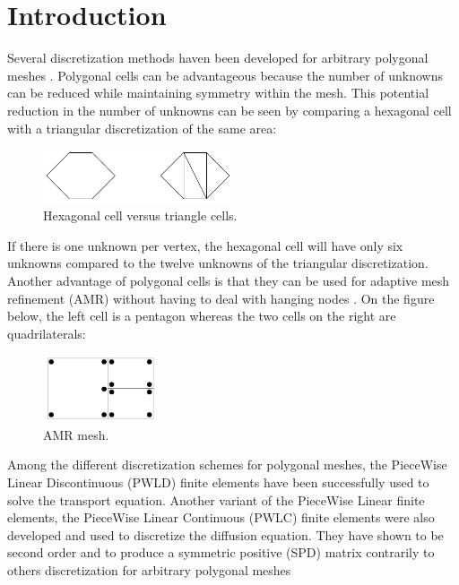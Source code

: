 \section{Introduction}
Several discretization methods haven been developed for arbitrary polygonal
meshes \cite{pwld_2d,pwld_3d,pwl_diffusion,palmer_ane,palmer_proc,palmer_fe,
wachspress,cell_centered_diff,mimetic}. Polygonal cells can be advantageous 
because the number of unknowns can be reduced while maintaining symmetry 
within the mesh. This potential reduction in the number of unknowns can be 
seen by comparing a hexagonal cell with a triangular discretization of the 
same area:
\begin{figure}[H]
\centering
\includegraphics[width=0.5\textwidth]{hex_tri_cells}
\caption{Hexagonal cell versus triangle cells.}
\end{figure}
If there is one unknown per vertex, the hexagonal cell will have only six
unknowns compared to the twelve unknowns of the triangular discretization. 
Another advantage of polygonal cells is that they can be used for adaptive 
mesh refinement (AMR) \cite{amr_rad,amr_block,amr_unstruc} without having to
deal with hanging nodes \cite{arbitrary_hanging_nodes,dealII_hanging_nodes,
locally_hanging_nodes}. On the figure below, the left cell is a pentagon whereas 
the two cells on the right are quadrilaterals:
\begin{figure}[H]
\centering
\includegraphics[width=0.3\textwidth]{amr}
\caption{AMR mesh.}
\end{figure}
Among the different discretization schemes for polygonal meshes, the PieceWise 
Linear Discontinuous (PWLD) finite elements \cite{pwld_2d,pwld_3d} have been 
successfully used to solve the transport equation. Another variant of the
PieceWise Linear finite elements, the PieceWise Linear Continuous (PWLC) finite 
elements were also developed and used to discretize the diffusion equation. 
They have shown to be second order and to produce a symmetric positive (SPD) 
matrix contrarily to others discretization for arbitrary polygonal meshes 
